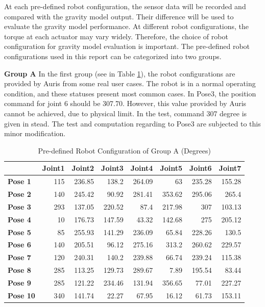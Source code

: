 At each pre-defined robot configuration, the sensor data will be recorded and compared with the gravity model output. Their difference will be used to evaluate the gravity model performance.  At different robot configurations, the torque at each actuator may vary widely. Therefore, the choice of robot configuration for gravity model evaluation is important. 
The pre-defined robot configurations used in this report can be categorized into two groups. 

\textbf{Group A}
In the first group (see in Table \ref{table-groupA}), the robot configurations are provided by Auris from some real user cases. The robot is in a normal operating condition, and these statuses present most common cases. In Pose3, the position command for joint 6 should be 307.70. However, this value provided by Auris cannot be achieved, due to physical limit. In the test, command 307 degree is given in stead. The test and computation regarding to Pose3 are subjected to this minor modification.

\begin{table}[]
	\centering
	\caption{Pre-defined Robot Configuration of Group A (Degrees)}
	\label{table-groupA}
	\begin{tabular}{|l|r|r|r|r|r|r|r|}
		\hline
		\textbf{} & \textbf{Joint1} & \textbf{Joint2} & \textbf{Joint3} & \textbf{Joint4} & \textbf{Joint5} & \textbf{Joint6} & \textbf{Joint7} \\ \hline
		\textbf{Pose 1}  & 115     & 236.85     & 138.2     & 264.09     & 63      & 235.28      & 155.28      \\ \hline
		\textbf{Pose 2}  & 140     & 245.42     & 90.92     & 281.41     & 353.62      & 295.06      & 265.4      \\ \hline
		\textbf{Pose 3}  & 293     & 137.05     & 220.52     & 87.4     & 217.98      & 307      & 103.13      \\ \hline
		\textbf{Pose 4}  & 10     & 176.73     & 147.59     & 43.32     & 142.68      & 275      & 205.12      \\ \hline
		\textbf{Pose 5}  & 85     & 255.93     & 141.29     & 236.09     & 65.84      & 228.26      & 130.5      \\ \hline
		\textbf{Pose 6}  & 140     & 205.51     & 96.12     & 275.16     & 313.2      & 260.62      & 229.57      \\ \hline
		\textbf{Pose 7}  & 120     & 240.31     & 140.2     & 239.88     & 66.74      & 239.24      & 115.38      \\ \hline
		\textbf{Pose 8}  & 285     & 113.25     & 129.73     & 289.67     & 7.89      & 195.54      & 83.44      \\ \hline
		\textbf{Pose 9}  & 285     & 121.22     & 234.46     & 131.94     & 356.65      & 77.01      & 227.27      \\ \hline
		\textbf{Pose 10} & 340    & 141.74    & 22.27    & 67.95    & 16.12     & 61.73     & 153.11      \\ \hline
	\end{tabular}

\end{table}

